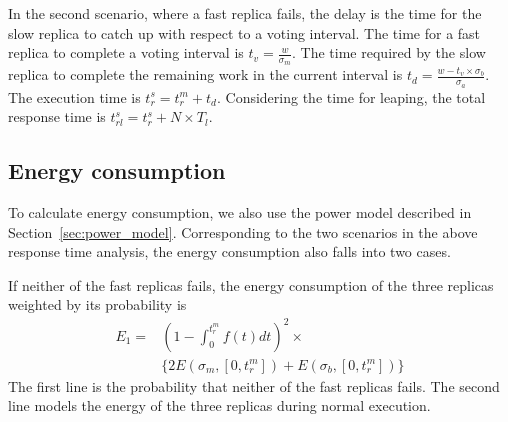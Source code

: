 In the second scenario, 
where a fast replica fails, the delay is the time for the slow replica to catch up with respect to a voting interval. The time for a fast replica to complete a voting interval is $t_v = \frac{w}{\sigma_m}$. The time required by the slow replica to complete the remaining work in the current interval is $t_d = \frac{w - t_v\times \sigma_b}{\sigma_a}$. The execution time is $t_r^s = t_r^m + t_d$. Considering the time for leaping, the total response time is $t_{rl}^s=t_r^s + N \times T_l$.



\subsection{Energy consumption}
To calculate energy consumption, we also use the power model described in Section~\ref{sec:power_model}.
Corresponding to the two scenarios in the above response time analysis, the energy consumption also falls into two cases. 

If neither of the fast replicas fails, the energy consumption of the three replicas weighted by its probability is
\begin{equation}
\begin{split}
E_1 = & (1 - \int_{0}^{t_r^m} f(t)dt)^2  \times \\
      & \{2E(\sigma_m, [0, t_r^m])+E(\sigma_b, [0, t_r^m])\}
\end{split}
\end{equation}
The first line is the probability that neither of the fast replicas fails. The second line models the energy of the three replicas during normal execution.


